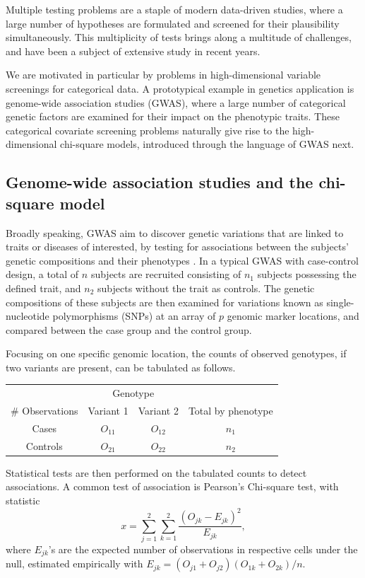 
Multiple testing problems are a staple of modern data-driven studies, where a large number of hypotheses are formulated and screened for their plausibility simultaneously.
This multiplicity of tests brings along a multitude of challenges, and have been a subject of extensive study in recent years.


We are motivated in particular by problems in high-dimensional variable screenings for categorical data. 
A prototypical example in genetics application is genome-wide association studies (GWAS), where a large number of categorical genetic factors are examined for their impact on the phenotypic traits.
These categorical covariate screening problems naturally give rise to the high-dimensional chi-square models, introduced through the language of GWAS next.

\subsection{Genome-wide association studies and the chi-square model}
\label{subsec:motivation-chisq}

Broadly speaking, GWAS aim to discover genetic variations that are linked to traits or diseases of interested, by testing for associations between the subjects' genetic compositions and their phenotypes \citep{bush2012genome}.
In a typical GWAS with case-control design, a total of $n$ subjects are recruited consisting of $n_1$ subjects possessing the defined trait, and $n_2$ subjects without the trait as controls.
The genetic compositions of these subjects are then examined for variations known as single-nucleotide polymorphisms (SNPs) at an array of $p$ genomic marker locations, and compared between the case group and the control group.

Focusing on one specific genomic location, the counts of observed genotypes, if two variants are present, can be tabulated as follows.
\begin{center}
    \begin{tabular}{cccc}
    \hline
    & \multicolumn{2}{c}{Genotype} & \\
    \cline{2-3}
    \# Observations & Variant 1 & Variant 2 & Total by phenotype \\
    \hline
    Cases & $O_{11}$ & $O_{12}$ & $n_1$ \\
    Controls & $O_{21}$ & $O_{22}$ & $n_2$ \\
    \hline
    \end{tabular}
\end{center}
Statistical tests are then performed on the tabulated counts to detect associations.
A common test of association is Pearson's Chi-square test, with statistic
\begin{equation} \label{eq:chisq-statistic}
    x = \sum_{j=1}^2 \sum_{k=1}^2 \frac{(O_{jk} - E_{jk})^2}{E_{jk}},
\end{equation}
where $E_{jk}$'s are the expected number of observations in respective cells under the null, estimated empirically with $E_{jk} = (O_{j1}+O_{j2})(O_{1k}+O_{2k})/n$.

